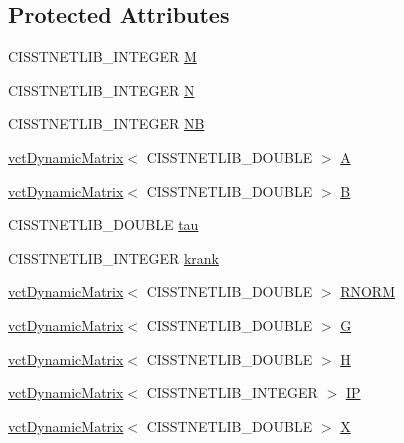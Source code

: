 \subsection*{Protected Attributes}
\begin{DoxyCompactItemize}
\item 
C\+I\+S\+S\+T\+N\+E\+T\+L\+I\+B\+\_\+\+I\+N\+T\+E\+G\+E\+R \hyperlink{classnmr_h_f_t_i_solver_a40cb06d09c71e3cc5ccb4801af493714}{M}
\item 
C\+I\+S\+S\+T\+N\+E\+T\+L\+I\+B\+\_\+\+I\+N\+T\+E\+G\+E\+R \hyperlink{classnmr_h_f_t_i_solver_aef47acf4465e3bbc224d29550ea68fed}{N}
\item 
C\+I\+S\+S\+T\+N\+E\+T\+L\+I\+B\+\_\+\+I\+N\+T\+E\+G\+E\+R \hyperlink{classnmr_h_f_t_i_solver_ab83977ce7dee82d78187122861d5492e}{N\+B}
\item 
\hyperlink{classvct_dynamic_matrix}{vct\+Dynamic\+Matrix}$<$ C\+I\+S\+S\+T\+N\+E\+T\+L\+I\+B\+\_\+\+D\+O\+U\+B\+L\+E $>$ \hyperlink{classnmr_h_f_t_i_solver_a3bf7da50e30b56b35fa988819596c883}{A}
\item 
\hyperlink{classvct_dynamic_matrix}{vct\+Dynamic\+Matrix}$<$ C\+I\+S\+S\+T\+N\+E\+T\+L\+I\+B\+\_\+\+D\+O\+U\+B\+L\+E $>$ \hyperlink{classnmr_h_f_t_i_solver_a208b4bacf42c9d2b336f40a84f1f24b4}{B}
\item 
C\+I\+S\+S\+T\+N\+E\+T\+L\+I\+B\+\_\+\+D\+O\+U\+B\+L\+E \hyperlink{classnmr_h_f_t_i_solver_ae2a7e0bc2500e3f05e2028b37b7666bc}{tau}
\item 
C\+I\+S\+S\+T\+N\+E\+T\+L\+I\+B\+\_\+\+I\+N\+T\+E\+G\+E\+R \hyperlink{classnmr_h_f_t_i_solver_ac7a0dd2e365ca0310b5bb988d7b0f5b2}{krank}
\item 
\hyperlink{classvct_dynamic_matrix}{vct\+Dynamic\+Matrix}$<$ C\+I\+S\+S\+T\+N\+E\+T\+L\+I\+B\+\_\+\+D\+O\+U\+B\+L\+E $>$ \hyperlink{classnmr_h_f_t_i_solver_a48c6c27d605fc52aca0b91a2f077e555}{R\+N\+O\+R\+M}
\item 
\hyperlink{classvct_dynamic_matrix}{vct\+Dynamic\+Matrix}$<$ C\+I\+S\+S\+T\+N\+E\+T\+L\+I\+B\+\_\+\+D\+O\+U\+B\+L\+E $>$ \hyperlink{classnmr_h_f_t_i_solver_a6b774e25595536c6c694d96dcef70587}{G}
\item 
\hyperlink{classvct_dynamic_matrix}{vct\+Dynamic\+Matrix}$<$ C\+I\+S\+S\+T\+N\+E\+T\+L\+I\+B\+\_\+\+D\+O\+U\+B\+L\+E $>$ \hyperlink{classnmr_h_f_t_i_solver_a501a8290546e44496608d9c0cca2a550}{H}
\item 
\hyperlink{classvct_dynamic_matrix}{vct\+Dynamic\+Matrix}$<$ C\+I\+S\+S\+T\+N\+E\+T\+L\+I\+B\+\_\+\+I\+N\+T\+E\+G\+E\+R $>$ \hyperlink{classnmr_h_f_t_i_solver_a42a92f5a8334b8974fb87d66abf24f99}{I\+P}
\item 
\hyperlink{classvct_dynamic_matrix}{vct\+Dynamic\+Matrix}$<$ C\+I\+S\+S\+T\+N\+E\+T\+L\+I\+B\+\_\+\+D\+O\+U\+B\+L\+E $>$ \hyperlink{classnmr_h_f_t_i_solver_a4e62d4f46bf8c16e79aef9063ce9a901}{X}
\end{DoxyCompactItemize}


